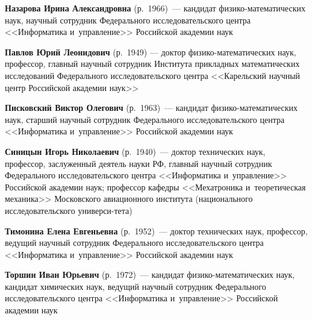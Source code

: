 \begin{multicols}{2}
\vspace*{2pt}

\noindent
\textbf{Назарова Ирина Александровна} (р.\ 1966)~--- кандидат фи\-зи\-ко-ма\-те\-ма\-ти\-че\-ских наук, 
научный сотрудник Федерального исследовательского цент\-ра <<Информатика и~управ\-ле\-ние>> Российской академии наук

\vspace*{2pt}

\noindent
\textbf{Павлов Юрий Леонидович} (р.\ 1949) --- доктор фи\-зи\-ко-ма\-те\-ма\-ти\-че\-ских наук, профессор, главный научный сотрудник 
Института при\-клад\-ных математических исследований Федерального \mbox{исследовательского} цент\-ра <<Карельский научный центр Российской академии наук>>

\vspace*{2pt}

\noindent
\textbf{Писковский Виктор Олегович} (р.\ 1963)~--- кандидат фи\-зи\-ко-ма\-те\-ма\-ти\-че\-ских наук, 
старший научный сотрудник Федерального исследовательского цент\-ра <<Информатика и~управ\-ле\-ние>> Российской академии наук


\pagebreak

\noindent
\textbf{Синицын Игорь Николаевич} (р.\ 1940)~--- доктор технических наук, профессор, заслуженный деятель науки РФ,
главный научный сотрудник Федерального исследовательского цент\-ра <<Информатика и~управ\-ле\-ние>> Российской академии наук;
профессор кафедры <<Мехатроника и~теоретическая механика>> Московского авиационного института (национального исследовательского универси-\linebreak тета)

\vspace*{2pt}

\noindent
\textbf{Тимонина Елена Евгеньевна} (р.\ 1952)~--- 
доктор технических наук, профессор, ведущий научный сотрудник Федерального исследовательского цент\-ра <<Информатика и~управ\-ле\-ние>>
 Российской академии наук

\vspace*{2pt}

\noindent
\textbf{Торшин Иван Юрьевич} (р.\ 1972)~--- кандидат фи\-зи\-ко-ма\-те\-ма\-ти\-че\-ских наук, кандидат химических наук, 
ведущий научный сотрудник Федерального исследовательского цент\-ра <<Информатика и~управ\-ле\-ние>> Российской академии наук


\end{multicols}
